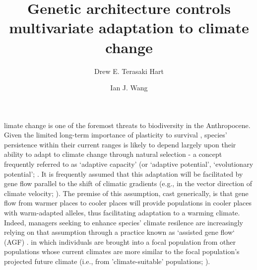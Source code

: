 \documentclass[9pt,twocolumn,twoside,lineno]{pnas-new}
\title{Genetic architecture controls multivariate adaptation to climate change}
\author[a,1]{Drew E. Terasaki Hart}
\author[a]{Ian J. Wang}
\affil[a]{Department of Environmental Science, Policy, and Management, University of California, Berkeley, CA 94720}
\begin{document}
\maketitle
\thispagestyle{firststyle}




limate change is one of the foremost threats to biodiversity in the Anthropocene.
Given the limited long-term importance of plasticity to survival \cite{chevin},
species’ persistence within their current ranges is likely to depend largely upon their ability to
adapt to climate change through natural selection - a concept frequently referred to 
as `adaptive capacity’ (or `adaptive potential’, `evolutionary potential’; 
\cite{chevin,harrisson,nicotra,vilas,wade}.
It is frequently assumed that this adaptation will be facilitated
by gene flow parallel to the shift of climatic gradients
(e.g., in the vector
direction of climate velocity; \cite{ackerly}).
The premise of this 
assumption, cast generically, is that gene flow from warmer places to
cooler places will provide populations in cooler places with warm-adapted alleles,
thus facilitating adaptation to a warming climate. 
Indeed, managers seeking to enhance species' climate resilence
are increasingly relying on that assumption
through a practice known as `assisted gene flow` (AGF) \cite{aitken_whitlock}.
in which individuals are brought into a focal population
from other populations whose current 
climates are more similar to the focal population's projected future climate
(i.e., from 'climate-suitable' populations; \cite{bellis}).
\end{document}
